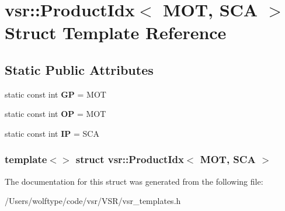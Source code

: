 \hypertarget{structvsr_1_1_product_idx_3_01_m_o_t_00_01_s_c_a_01_4}{\section{vsr\-:\-:Product\-Idx$<$ M\-O\-T, S\-C\-A $>$ Struct Template Reference}
\label{structvsr_1_1_product_idx_3_01_m_o_t_00_01_s_c_a_01_4}
}
\subsection*{Static Public Attributes}
\begin{DoxyCompactItemize}
\item 
\hypertarget{structvsr_1_1_product_idx_3_01_m_o_t_00_01_s_c_a_01_4_af06004e720c36df9d55bd8bbc96afdaf}{static const int {\bfseries G\-P} = M\-O\-T}\label{structvsr_1_1_product_idx_3_01_m_o_t_00_01_s_c_a_01_4_af06004e720c36df9d55bd8bbc96afdaf}

\item 
\hypertarget{structvsr_1_1_product_idx_3_01_m_o_t_00_01_s_c_a_01_4_a7607d188a873127850ba8d1aa42ae5ea}{static const int {\bfseries O\-P} = M\-O\-T}\label{structvsr_1_1_product_idx_3_01_m_o_t_00_01_s_c_a_01_4_a7607d188a873127850ba8d1aa42ae5ea}

\item 
\hypertarget{structvsr_1_1_product_idx_3_01_m_o_t_00_01_s_c_a_01_4_a2152afdcc3e7de5a4732946f24fc65c5}{static const int {\bfseries I\-P} = S\-C\-A}\label{structvsr_1_1_product_idx_3_01_m_o_t_00_01_s_c_a_01_4_a2152afdcc3e7de5a4732946f24fc65c5}

\end{DoxyCompactItemize}
\subsubsection*{template$<$$>$ struct vsr\-::\-Product\-Idx$<$ M\-O\-T, S\-C\-A $>$}



The documentation for this struct was generated from the following file\-:\begin{DoxyCompactItemize}
\item 
/\-Users/wolftype/code/vsr/\-V\-S\-R/vsr\-\_\-templates.\-h\end{DoxyCompactItemize}
